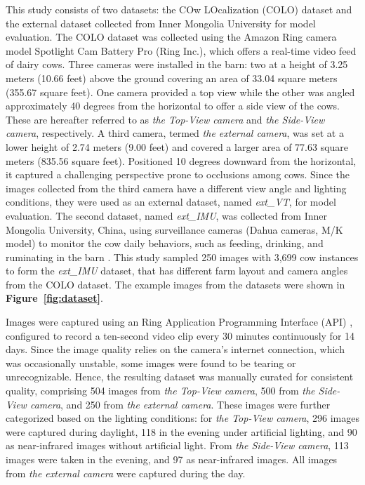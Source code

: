 This study consists of two datasets: the COw LOcalization (COLO) dataset and the external dataset collected from Inner Mongolia University for model evaluation. The COLO dataset was collected using the Amazon Ring camera model Spotlight Cam Battery Pro (Ring Inc.), which offers a real-time video feed of dairy cows. Three cameras were installed in the barn: two at a height of 3.25 meters (10.66 feet) above the ground covering an area of 33.04 square meters (355.67 square feet). One camera provided a top view while the other was angled approximately 40 degrees from the horizontal to offer a side view of the cows. These are hereafter referred to as \textit{the Top-View camera} and \textit{the Side-View camera}, respectively. A third camera, termed \textit{the external camera}, was set at a lower height of 2.74 meters (9.00 feet) and covered a larger area of 77.63 square meters (835.56 square feet). Positioned 10 degrees downward from the horizontal, it captured a challenging perspective prone to occlusions among cows. Since the images collected from the third camera have a different view angle and lighting conditions, they were used as an external dataset, named \textit{ext\_VT}, for model evaluation. The second dataset, named \textit{ext\_IMU}, was collected from Inner Mongolia University, China, using surveillance cameras (Dahua cameras, M/K model) to monitor the cow daily behaviors, such as feeding, drinking, and ruminating in the barn \citep{li_new_2024}. This study sampled 250 images with 3,699 cow instances to form the \textit{ext\_IMU} dataset, that has different farm layout and camera angles from the COLO dataset. The example images from the datasets were shown in \textbf{Figure~\ref{fig:dataset}}. 

Images were captured using an Ring Application Programming Interface (API) \cite{greif_dgreifring_2024}, configured to record a ten-second video clip every 30 minutes continuously for 14 days. Since the image quality relies on the camera's internet connection, which was occasionally unstable, some images were found to be tearing or unrecognizable. Hence, the resulting dataset was manually curated for consistent quality, comprising 504 images from \textit{the Top-View camera}, 500 from \textit{the Side-View camera}, and 250 from \textit{the external camera}. These images were further categorized based on the lighting conditions: for \textit{the Top-View camera}, 296 images were captured during daylight, 118 in the evening under artificial lighting, and 90 as near-infrared images without artificial light. From \textit{the Side-View camera}, 113 images were taken in the evening, and 97 as near-infrared images. All images from \textit{the external camera} were captured during the day.

